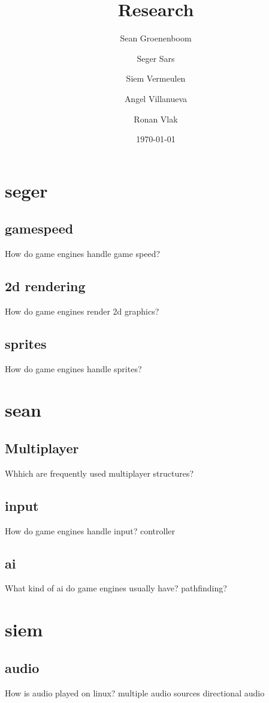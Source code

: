 \documentclass{article} %
\title{Research} %
\author{Sean Groenenboom \and Seger Sars \and Siem Vermeulen \and Angel Villanueva \and Ronan Vlak} %
\date{\today} %
\begin{document}
\maketitle %
\newpage

\tableofcontents %
\newpage

\section{seger}
\subsection{gamespeed}
How do game engines handle game speed?
\subsection{2d rendering}
How do game engines render 2d graphics?
\subsection{sprites}
How do game engines handle sprites?
\newpage

\section{sean}
\subsection{Multiplayer}
Whhich are frequently used multiplayer structures?
\subsection{input}
How do game engines handle input?
controller
\subsection{ai}
What kind of ai do game engines usually have?
pathfinding?
\newpage

\section{siem}
\subsection{audio}
How is audio played on linux?
multiple audio sources
directional audio
\end{document}
